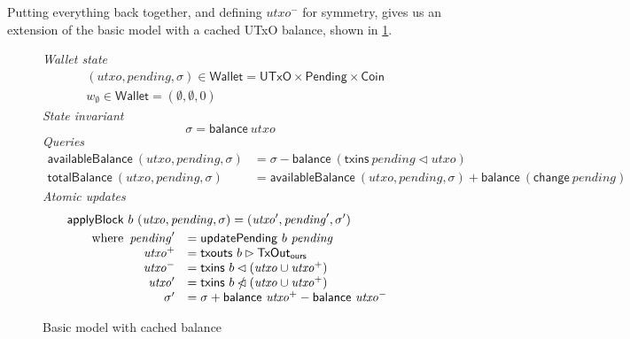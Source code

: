 \documentclass{article}
\newcommand{\restrictdom}{\lhd}
\newcommand{\subtractdom}{\mathbin{\slashed{\restrictdom}}}
\newcommand{\restrictrange}{\rhd}
\theoremstyle{definition}{
  \newtheorem{lemma}{Lemma}[section] %
  \newtheorem{definition}[lemma]{Definition}
}
\theoremstyle{theorem}{
  \newtheorem{invariant}[lemma]{Invariant}
  \newtheorem{proofobligation}[lemma]{Proof Obligation}
}
\numberwithin{equation}{lemma}
\begin{document}
Putting everything back together, and defining $utxo^-$ for symmetry, gives
us an extension of the basic model with a cached UTxO balance, shown
in \cref{fig:model_with_cached_balance}.

\begin{figure}[p]
%
\emph{Wallet state}
%
\begin{align*}
& (\mathit{utxo}, \mathit{pending}, \sigma) \in \mathsf{Wallet} = \mathsf{UTxO} \times \mathsf{Pending} \times \mathsf{Coin} \\
& w_\emptyset \in \mathsf{Wallet} = (\emptyset, \emptyset, 0)
\end{align*}
%
\emph{State invariant}
%
\begin{equation*}
\sigma = \mathsf{balance} ~ \mathit{utxo}
\end{equation*}
%
\emph{Queries}
%
\begin{align*}
  \mathsf{availableBalance} ~ (\mathit{utxo}, \mathit{pending}, \sigma)
& = \sigma - \mathsf{balance} ~ (\mathsf{txins} ~ \mathit{pending} \restrictdom utxo) \\
  \mathsf{totalBalance} ~ (\mathit{utxo}, \mathit{pending}, \sigma)
& = \mathsf{availableBalance} ~ (\mathit{utxo}, \mathit{pending}, \sigma) + \mathsf{balance} ~ (\mathsf{change} ~ \mathit{pending})
\end{align*}
%
\emph{Atomic updates}
%
\begin{align*}
& \mathsf{applyBlock} ~ b ~ (\mathit{utxo}, \mathit{pending}, \sigma) = (\mathit{utxo}^\prime, \mathit{pending}^\prime, \sigma^\prime) \\
& \qquad \text{where}
  \begin{array}[t]{rl}
    \mathit{pending}^\prime & = \mathsf{updatePending} ~ b ~ \mathit{pending} \\
    \mathit{utxo}^+ & = \mathsf{txouts} ~ b \restrictrange \mathsf{TxOut_{ours}} \\
    \mathit{utxo}^- & = \mathsf{txins} ~ b \restrictdom (\mathit{utxo} \cup \mathit{utxo}^+) \\
    \mathit{utxo}^\prime & = \mathsf{txins} ~ b \subtractdom (\mathit{utxo} \cup \mathit{utxo}^+) \\
    \sigma^\prime & = \sigma + \mathsf{balance} ~ \mathit{utxo}^+ - \mathsf{balance} ~ \mathit{utxo}^-
  \end{array}
\end{align*}
%
\caption{\label{fig:model_with_cached_balance}Basic model with cached balance}
\end{figure}
\end{document}
